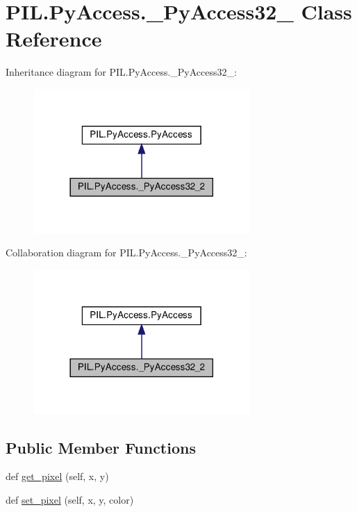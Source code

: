 \hypertarget{classPIL_1_1PyAccess_1_1__PyAccess32__2}{}\section{P\+I\+L.\+Py\+Access.\+\_\+\+Py\+Access32\+\_ Class Reference}
\label{classPIL_1_1PyAccess_1_1__PyAccess32__2}


Inheritance diagram for P\+I\+L.\+Py\+Access.\+\_\+\+Py\+Access32\+\_\+:
\nopagebreak
\begin{figure}[H]
\begin{center}
\leavevmode
\includegraphics[width=234pt]{classPIL_1_1PyAccess_1_1__PyAccess32__2__inherit__graph}
\end{center}
\end{figure}


Collaboration diagram for P\+I\+L.\+Py\+Access.\+\_\+\+Py\+Access32\+\_\+:
\nopagebreak
\begin{figure}[H]
\begin{center}
\leavevmode
\includegraphics[width=234pt]{classPIL_1_1PyAccess_1_1__PyAccess32__2__coll__graph}
\end{center}
\end{figure}
\subsection*{Public Member Functions}
\begin{DoxyCompactItemize}
\item 
def \hyperlink{classPIL_1_1PyAccess_1_1__PyAccess32__2_ab2a69a340880f9bee8aaceeb4349d7bc}{get\+\_\+pixel} (self, x, y)
\item 
def \hyperlink{classPIL_1_1PyAccess_1_1__PyAccess32__2_a37863cd14ca0950d58b0711d50c6754e}{set\+\_\+pixel} (self, x, y, color)
\end{DoxyCompactItemize}
